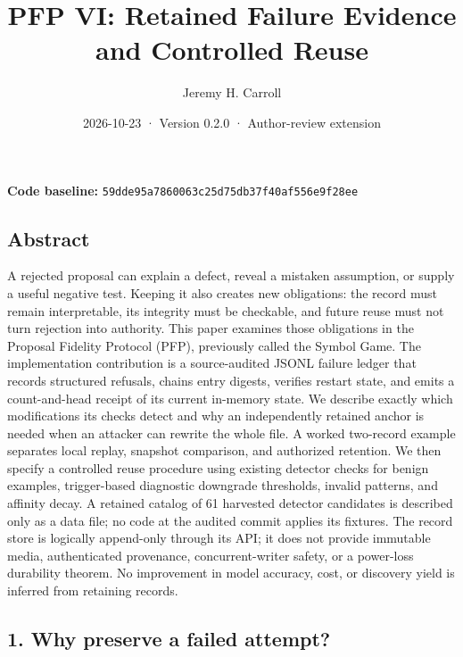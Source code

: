 \documentclass[
  11pt,
]{article}
\title{PFP VI: Retained Failure Evidence and Controlled Reuse}
\author{Jeremy H. Carroll}
\date{2026-10-23 · Version 0.2.0 · Author-review extension}
\begin{document}
\makeatletter
\begin{center}
{\LARGE \@title\par}
\vspace{0.8em}
{\normalsize \@author\par}
\vspace{0.5em}
{\small \@date\par}
\end{center}
\makeatother

\textbf{Code baseline:}
\nolinkurl{59dde95a7860063c25d75db37f40af556e9f28ee}

\subsection{Abstract}\label{abstract}

A rejected proposal can explain a defect, reveal a mistaken assumption,
or supply a useful negative test. Keeping it also creates new
obligations: the record must remain interpretable, its integrity must be
checkable, and future reuse must not turn rejection into authority. This
paper examines those obligations in the Proposal Fidelity Protocol
(PFP), previously called the Symbol Game. The implementation
contribution is a source-audited JSONL failure ledger that records
structured refusals, chains entry digests, verifies restart state, and
emits a count-and-head receipt of its current in-memory state. We
describe exactly which modifications its checks detect and why an
independently retained anchor is needed when an attacker can rewrite the
whole file. A worked two-record example separates local replay, snapshot
comparison, and authorized retention. We then specify a controlled reuse
procedure using existing detector checks for benign examples,
trigger-based diagnostic downgrade thresholds, invalid patterns, and
affinity decay. A retained catalog of 61 harvested detector candidates
is described only as a data file; no code at the audited commit applies
its fixtures. The record store is logically append-only through its API;
it does not provide immutable media, authenticated provenance,
concurrent-writer safety, or a power-loss durability theorem. No
improvement in model accuracy, cost, or discovery yield is inferred from
retaining records.

\subsection{1. Why preserve a failed
attempt?}\label{why-preserve-a-failed-attempt}
\end{document}
